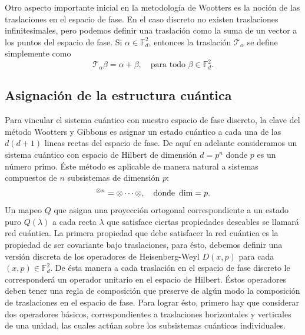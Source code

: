 \documentclass[a4paper]{report}
\let\H\relax
\DeclareMathOperator{\H}{\mathcal H}
\begin{document}
  Otro aspecto importante inicial en la metodología de
  Wootters es la noción de las traslaciones en el
  espacio de fase. En el caso discreto no existen
  traslaciones infinitesimales, pero podemos definir una
  traslación como la suma de un vector a los puntos del
  espacio de fase. Si $\alpha \in \mathbb F_d^2$, entonces
  la traslación $\mathcal T_\alpha$ se define simplemente
  como
  \begin{equation}
    \mathcal T_\alpha \beta = \alpha + \beta,
    \quad
    \text{para todo } \beta \in \mathbb F_d^2.
  \end{equation} 

  \subsection{Asignación de la estructura cuántica}

  Para vincular el sistema cuántico con nuestro espacio de
  fase discreto, la clave del método Wootters y Gibbons es
  asignar un estado cuántico a cada una de las $d(d+1)$
  lineas rectas del espacio de fase. De aquí en adelante
  consideramos un sistema cuántico con espacio de Hilbert de
  dimensión $d = p^{n}$ donde $p$ es un número primo. Éste
  método es aplicable de manera natural a sistemas
  compuestos de $n$ subsistemas de dimensión $p$:
  \begin{equation}
    \H^{\otimes n}
    = \H \otimes \cdots \otimes \H,
    \quad
    \text{donde } \dim\H = p.
  \end{equation}
  Un mapeo $Q$ que asigna
  una proyección ortogonal correspondiente a un estado puro
  $Q(\lambda)$ a cada recta $\lambda$ que satisface ciertas
  propiedades deseables se llamará red
  cuántica. La primera propiedad que debe satisfacer la red
  cuántica es la propiedad de ser covariante bajo
  traslaciones, para ésto, debemos definir una versión
  discreta de los operadores de Heisenberg-Weyl $ D(x,p)$
  para cada $(x,p) \in \mathbb F_d^2$. De ésta
  manera a cada traslación en el espacio de fase discreto le
  corresponderá un operador unitario en el espacio de
  Hilbert. Éstos operadores deben tener una regla de
  composición que preserve de algún modo la composición de
  traslaciones en el espacio de fase. Para lograr ésto,
  primero hay que considerar dos operadores básicos,
  correspondientes a traslaciones horizontales y verticales
  de una unidad, las cuales actúan sobre los subsistemas
  cuánticos individuales.
\end{document}
